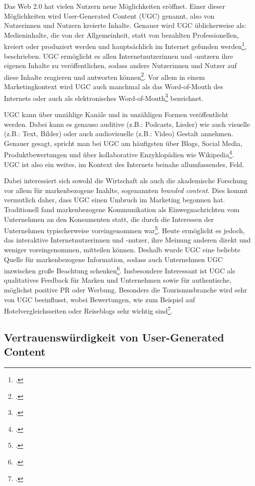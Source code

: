 Das Web 2.0 hat vielen Nutzern neue Möglichkeiten eröffnet. Einer dieser Möglichkeiten wird User-Generated Content (UGC) genannt, also von Nutzerinnen und Nutzern kreierte Inhalte. Genauer wird UGC üblicherweise als: Medieninhalte, die von der Allgemeinheit, statt von bezahlten Professionellen, kreiert oder produziert werden und hauptsächlich im Internet gefunden werden\footcite{terry}, beschrieben. UGC ermöglicht es allen Internetnutzerinnen und -nutzern ihre eigenen Inhalte zu veröffentlichen, sodass andere Nutzerinnen und Nutzer auf diese Inhalte reagieren und antworten können\footcite{cox}. Vor allem in einem Marketingkontext wird UGC auch manchmal als das Word-of-Mouth des Internets oder auch als elektronisches Word-of-Mouth\footcite{morrison} bezeichnet.

UGC kann über unzählige Kanäle und in unzähligen Formen veröffentlicht werden. Dabei kann es genauso auditive (z.B.: Podcasts, Lieder) wie auch visuelle (z.B.: Text, Bilder) oder auch audiovisuelle (z.B.: Video) Gestalt annehmen. Genauer gesagt, spricht man bei UGC am häufigsten über Blogs, Social Media, Produktbewertungen und über kollaborative Enzyklopädien wie Wikipedia\footcite{chen}. UGC ist also ein weites, im Kontext des Internets beinahe allumfassendes, Feld.

Dabei interessiert sich sowohl die Wirtschaft als auch die akademische Forschung vor allem für markenbezogene Inahlte, sogenannten \textit{branded content}. Dies kommt vermutlich daher, dass UGC einen Umbruch im Marketing begonnen hat. Traditionell fand markenbezogene Kommunikation als Einwegnachrichten vom Unternehmen an den Konsumenten statt, die durch die Interessen der Unternehmen typischerweise voreingenommen war\footcite{ramirez}. Heute ermöglicht es jedoch, das interaktive Internetnutzerinnen und -nutzer, ihre Meinung anderen direkt und weniger voreingenommen, mitteilen können. Deshalb wurde UGC eine beliebte Quelle für markenbezogene Information, sodass auch Unternehmen UGC inzwischen große Beachtung schenken\footcite{ramirez}. Insbesondere Interessant ist UGC als qualitatives Feedback für Marken und Unternehmen sowie für authentische, möglichst positive PR oder Werbung. Besonders die Tourismusbranche wird sehr von UGC beeinflusst, wobei Bewertungen, wie zum Beispiel auf Hotelvergleichsseiten oder Reiseblogs sehr wichtig sind\footcite{akehurst}.

\subsection{Vertrauenswürdigkeit von User-Generated Content}

